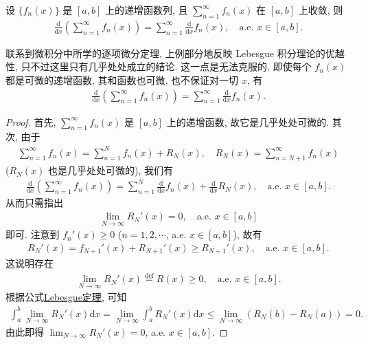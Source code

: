 \documentclass[../../main.tex]{subfiles}%
\begin{document}
\begin{theorem}\label{theorem:实变函数--Fubini 逐项微分定理}
设 $\{f_n(x)\}$ 是 $[a,b]$ 上的递增函数列, 且 $\sum_{n=1}^\infty f_n(x)$ 在 $[a,b]$ 上收敛, 则
\begin{align*}
\frac{\mathrm{d}}{\mathrm{d}x}\left(\sum_{n=1}^\infty f_n(x)\right) = \sum_{n=1}^\infty \frac{\mathrm{d}}{\mathrm{d}x}f_n(x), \quad \text{a.e. } x\in[a,b].
\end{align*}
\end{theorem}
\begin{remark}
联系到微积分中所学的逐项微分定理, 上例部分地反映 Lebesgue 积分理论的优越性, 只不过这里只有几乎处处成立的结论. 这一点是无法克服的, 即使每个 $f_n(x)$ 都是可微的递增函数, 其和函数也可微, 也不保证对一切 $x$, 有
\begin{align*}
\frac{\mathrm{d}}{\mathrm{d}x}\left(\sum_{n=1}^\infty f_n(x)\right) = \sum_{n=1}^\infty \frac{\mathrm{d}}{\mathrm{d}x}f_n(x).
\end{align*}
\end{remark}
\begin{proof}
首先, $\sum_{n=1}^\infty f_n(x)$ 是 $[a,b]$ 上的递增函数, 故它是几乎处处可微的. 其次, 由于
\begin{align*}
\sum_{n=1}^\infty f_n(x) = \sum_{n=1}^N f_n(x) + R_N(x), \quad R_N(x) = \sum_{n=N+1}^\infty f_n(x)
\end{align*}
($R_N(x)$ 也是几乎处处可微的), 我们有
\begin{align*}
\frac{\mathrm{d}}{\mathrm{d}x}\left(\sum_{n=1}^\infty f_n(x)\right) = \sum_{n=1}^N \frac{\mathrm{d}}{\mathrm{d}x}f_n(x) + \frac{\mathrm{d}}{\mathrm{d}x}R_N(x), \quad \text{a.e. } x\in[a,b].
\end{align*}
从而只需指出
\begin{align*}
\lim_{N\to\infty} R_N'(x) = 0, \quad \text{a.e. } x\in[a,b]
\end{align*}
即可. 注意到 $f_n'(x)\geqslant 0$ ($n=1,2,\cdots$, a.e. $x\in[a,b]$), 故有
\begin{align*}
R_N'(x) = f_{N+1}'(x) + R_{N+1}'(x) \geqslant R_{N+1}'(x), \quad \text{a.e. } x\in[a,b].
\end{align*}
这说明存在
\begin{align*}
\lim_{N\to\infty} R_N'(x) \stackrel{\text{def}}{=} R(x) \geqslant 0, \quad \text{a.e. } x\in[a,b].
\end{align*}
根据公式\hyperref[theorem:Lebesgue定理--实变函数]{Lebesgue定理}, 可知
\begin{align*}
\int_a^b \lim_{N\to\infty} R_N'(x)\mathrm{d}x = \lim_{N\to\infty} \int_a^b R_N'(x)\mathrm{d}x 
\leqslant \lim_{N\to\infty} (R_N(b)-R_N(a)) = 0.
\end{align*}
由此即得 $\lim_{N\to\infty} R_N'(x) = 0$, a.e. $x\in[a,b]$.
\end{proof}
\end{document}
